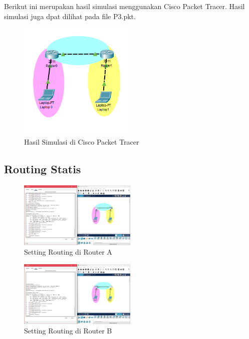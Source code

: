 Berikut ini merupakan hasil simulasi menggunakan Cisco Packet Tracer. Hasil simulasi juga dpat dilihat pada file P3.pkt.

\begin{figure}[h!] 
    \centering
    \includegraphics[width=0.5\textwidth]{tumod/simulasi.png} 
    \caption{Hasil Simulasi di Cisco Packet Tracer} 
    \label{fig:tumod1} 
\end{figure}

\subsection{Routing Statis}

\begin{figure}[H] 
    \centering
    \includegraphics[width=0.5\textwidth]{tumod/jarkom tumod 5.png} 
    \caption{Setting Routing di Router A} 
    \label{fig:tumod4} 
\end{figure}

\begin{figure}[H] 
    \centering
    \includegraphics[width=0.5\textwidth]{tumod/jarkom tumod 6.png} 
    \caption{Setting Routing di Router B} 
    \label{fig:tumod5} 
\end{figure}


